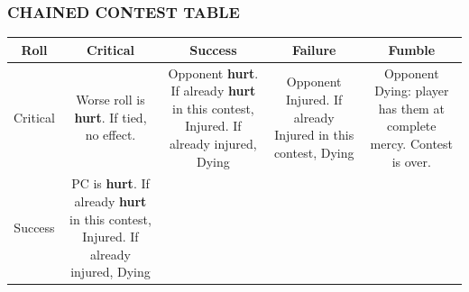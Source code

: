 \documentclass[
]{article}
\begin{document}
\hypertarget{chained-contest-table}{%
\subsubsection{CHAINED CONTEST TABLE}\label{chained-contest-table}}

\begin{longtable}[]{@{}ccccc@{}}
\toprule
\begin{minipage}[b]{0.11\columnwidth}\centering
Roll\strut
\end{minipage} & \begin{minipage}[b]{0.19\columnwidth}\centering
Critical\strut
\end{minipage} & \begin{minipage}[b]{0.19\columnwidth}\centering
Success\strut
\end{minipage} & \begin{minipage}[b]{0.19\columnwidth}\centering
Failure\strut
\end{minipage} & \begin{minipage}[b]{0.19\columnwidth}\centering
Fumble\strut
\end{minipage}\tabularnewline
\midrule
\endhead
\begin{minipage}[t]{0.11\columnwidth}\centering
Critical\strut
\end{minipage} & \begin{minipage}[t]{0.19\columnwidth}\centering
Worse roll is \textbf{hurt}. If tied, no effect.\strut
\end{minipage} & \begin{minipage}[t]{0.19\columnwidth}\centering
Opponent \textbf{hurt}. If already \textbf{hurt} in this contest,
Injured. If already injured, Dying\strut
\end{minipage} & \begin{minipage}[t]{0.19\columnwidth}\centering
Opponent Injured. If already Injured in this contest, Dying\strut
\end{minipage} & \begin{minipage}[t]{0.19\columnwidth}\centering
Opponent Dying: player has them at complete mercy. Contest is
over.\strut
\end{minipage}\tabularnewline
\begin{minipage}[t]{0.11\columnwidth}\centering
Success\strut
\end{minipage} & \begin{minipage}[t]{0.19\columnwidth}\centering
PC is \textbf{hurt}. If already \textbf{hurt} in this contest, Injured.
If already injured, Dying\strut

\end{minipage}
\end{longtable}
\end{document}
